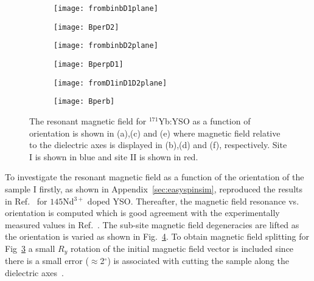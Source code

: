 \begin{figure}[H]
    \centering
    \begin{subfigure}[b]{0.46\textwidth}
        \centering
        \texttt{[image: frombinbD1plane]}
        \caption{\label{fig:simmagresori1}}
    \end{subfigure}
    \begin{subfigure}[b]{0.3\textwidth}
        \centering
        \texttt{[image: BperD2]}
   \caption{}
   \end{subfigure}
       \begin{subfigure}[b]{0.46\textwidth}
        \centering
        \texttt{[image: frombinbD2plane]}
   \caption{\label{fig:simmagresori2}}
   \end{subfigure}
       \begin{subfigure}[b]{0.3\textwidth}
        \centering
        \texttt{[image: BperpD1]}
   \caption{}
   \end{subfigure}
       \begin{subfigure}[b]{0.46\textwidth}
        \centering
        \texttt{[image: fromD1inD1D2plane]}
   \caption{\label{fig:simmagresori3}}
   \end{subfigure}
       \begin{subfigure}[b]{0.3\textwidth}
        \centering
        \texttt{[image: Bperb]}
   \caption{}
   \end{subfigure}
   \caption{The resonant magnetic field for $^{171}$Yb:YSO as a function of orientation is shown in (a),(c) and (e) where magnetic field relative to the dielectric axes is displayed in (b),(d) and (f), respectively. Site I is shown in blue and site II is shown in red.}
   \label{fig:simmagresori}
\end{figure}

To investigate the resonant magnetic field as a function of the orientation of the sample I firstly, as shown in Appendix~\ref{sec:easyspinsim}, reproduced the results in Ref.~\citep{mairflaig} for $145$Nd$^{3+}$ doped YSO. Thereafter, the magnetic field resonance vs. orientation is computed which is good agreement with the experimentally measured values in Ref.~\citep{PhysRevB.94.155116}. The sub-site magnetic field degeneracies are lifted as the orientation is varied as shown in Fig.~\ref{fig:simmagresori}. To obtain magnetic field splitting for Fig~\ref{fig:simmagresori3} a small $R_{y}$ rotation of the initial magnetic field vector is included since there is a small error ($\approx$2$^{\circ}$) is associated with cutting the sample along the dielectric axes~\citep{PhysRevB.94.155116}.    


